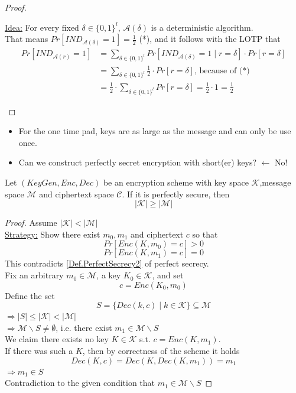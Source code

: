 \begin{proof}
\begin{itemize}
					\underline{Idea:} For every fixed $\delta \in \{0,1\}^l$, $\mathcal{A}(\delta)$ is a deterministic algorithm.\\
					That means $Pr[IND_{\mathcal{A}(\delta)} = 1] = \frac{1}{2}$ (*), and it follows with the LOTP that
					\begin{align*}
						Pr[IND_{\mathcal{A}(r)} = 1] &= \sum\limits_{\delta \in \{0,1\}^l} Pr[IND_{\mathcal{A}(\delta)} = 1 \mid r = \delta] \cdot Pr[r = \delta]\\
						&= \sum\limits_{\delta \in \{0,1\}^l} \frac{1}{2} \cdot Pr[r = \delta] \text{, because of (*)}\\
						&= \frac{1}{2} \cdot \sum\limits_{\delta \in \{0,1\}^l} Pr[r = \delta] = \frac{1}{2} \cdot 1 = \frac{1}{2}
					\end{align*}

    		\end{itemize}
    	\end{proof}

	
    \begin{itemize}
    	\item For the one time pad, keys are as large as the message and can only be use once.
    	\item Can we construct perfectly secret encryption with short(er) keys? $\leftarrow$ No!
    \end{itemize}
    
    \begin{theorem}
        Let $(KeyGen,Enc,Dec)$ be an encryption scheme with key space $\mathcal{K}$,message space $\mathcal{M}$ and ciphertext space $\mathcal{C}$. If it is perfectly secure, then 
        $$\vert \mathcal{K} \vert \geq \vert \mathcal{M} \vert$$
    \end{theorem}
    \begin{proof}
    	Assume $|\mathcal{K}| < |\mathcal{M}|$\\
    	\underline{Strategy:} Show there exist $m_0,m_1$ and ciphertext $c$ so that
    		$$Pr[Enc(K,m_0) = c] > 0$$
    		$$Pr[Enc(K,m_1) = c] = 0$$
    	This contradicts \cref{Def.PerfectSecrecy2} of perfect secrecy.\\
    	
    	Fix an arbitrary $m_0 \in \mathcal{M}$, a key $K_0 \in \mathcal{K}$, and set
    		$$c = Enc(K_0,m_0)$$
    	Define the set
    		$$S = \{ Dec(k,c) \mid k \in \mathcal{K} \} \subseteq \mathcal{M}$$
    	$\Rightarrow |S| \leq |\mathcal{K}| < |\mathcal{M}|$\\
    	$\Rightarrow \mathcal{M} \backslash S \neq \emptyset$, i.e. there exist $m_1 \in \mathcal{M} \backslash S$\\
    	
    	We claim there exists no key $K \in \mathcal{K}$ s.t. $c = Enc(K,m_1)$.\\
    	If there was such a $K$, then by correctness of the scheme it holds
    		$$Dec(K,c) = Dec(K,Dec(K,m_1)) = m_1$$
    	$\Rightarrow m_1 \in S$\\
    	Contradiction to the given condition that $m_1 \in \mathcal{M} \backslash S$
    \end{proof}
    
